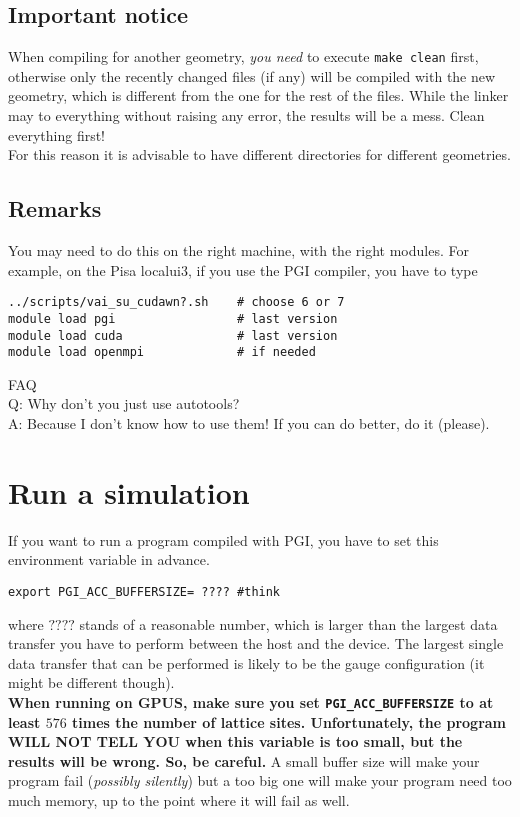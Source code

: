 \subsection{Important notice}

When compiling for another geometry, \emph{you need} to execute 
\verb|make clean| first, otherwise only the recently changed files  (if 
any) will be 
compiled with the new geometry, which is different from the one for the rest of 
the files. While 
the linker may to everything without raising any error, the results will be a 
mess. Clean everything first!\\

For this reason it is advisable to have different directories for different 
geometries.

\subsection{Remarks} 
You may need to do this on the right machine, with the right modules.
For example, on the Pisa localui3, if you use the PGI compiler,
you have to type
\begin{verbatim}
../scripts/vai_su_cudawn?.sh    # choose 6 or 7
module load pgi                 # last version
module load cuda                # last version
module load openmpi             # if needed 
\end{verbatim}




FAQ \\
Q: Why don't you just use autotools? \\
A: Because I don't know how to use them! If you can do better, do
it (please).



\section{Run a simulation}

If you want to run a program compiled with PGI, you have to set this 
environment variable in advance.
\begin{verbatim}
export PGI_ACC_BUFFERSIZE= ???? #think
\end{verbatim}
where $????$ stands of a reasonable number, which is larger than the largest 
data transfer you have to perform between the host and the device. The largest 
single data transfer that can be performed is likely to be the gauge 
configuration (it might be different though). \\
{ \bf When running on GPUS, make sure you set \verb|PGI_ACC_BUFFERSIZE| to at 
    least $576$ times the number of lattice sites. Unfortunately, the program WILL 
    NOT TELL YOU when this variable is too small, but the results will be wrong. 
So, be careful.}
A small buffer size will make your program fail (\emph{possibly silently}) 
but a too big one will make your program need too much memory, up to the point 
where it will fail as well.


